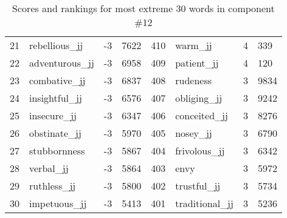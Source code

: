 \begin{table}[tbp]
\begin{tabular}{| rlr@{.}l | rlr@{.}l |}
    21 & rebellious\_jj & -3 & 7622    &    410 & warm\_jj & 4 & 339 \\
    22 & adventurous\_jj & -3 & 6958    &    409 & patient\_jj & 4 & 120 \\
    23 & combative\_jj & -3 & 6837    &    408 & rudeness & 3 & 9834 \\
    24 & insightful\_jj & -3 & 6576    &    407 & obliging\_jj & 3 & 9242 \\
    25 & insecure\_jj & -3 & 6347    &    406 & conceited\_jj & 3 & 8276 \\
    26 & obstinate\_jj & -3 & 5970    &    405 & nosey\_jj & 3 & 6790 \\
    27 & stubbornness & -3 & 5867    &    404 & frivolous\_jj & 3 & 6342 \\
    28 & verbal\_jj & -3 & 5864    &    403 & envy & 3 & 5972 \\
    29 & ruthless\_jj & -3 & 5800    &    402 & trustful\_jj & 3 & 5734 \\
    30 & impetuous\_jj & -3 & 5413    &    401 & traditional\_jj & 3 & 5236 \\
    \hline
    \end{tabular}
    \caption{Scores and rankings for most extreme 30 words in component \#12} 
\end{table}
\clearpage
